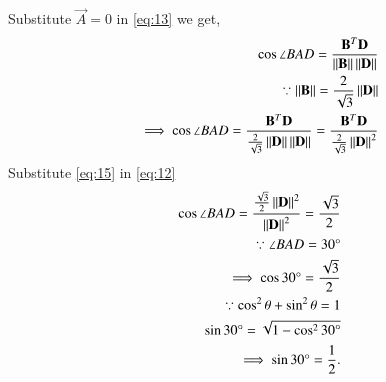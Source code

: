 \documentclass[journal,12pt,twocolumn]{IEEEtran}
\begin{document}
Substitute $\vec{A}=0$ in \eqref{eq:13} we get,
\begin{align}
    \cos{\angle{BAD}}=\frac{\mathbf{B}^T\mathbf{D}}{\left\lVert\mathbf{B}\right\rVert\left\lVert\mathbf{D}\right\rVert}\\
 \because\left\lVert\mathbf{B}\right\rVert=\frac{2}{\sqrt{3}}\left\lVert\mathbf{D}\right\rVert\\
     \label{eq:12}\implies\cos{\angle{BAD}}=\frac{\mathbf{B}^T\mathbf{D}}{\frac{2}{\sqrt{3}}\left\lVert\mathbf{D}\right\rVert\left\lVert\mathbf{D}\right\rVert} = \frac{\mathbf{B}^T\mathbf{D}}{\frac{2}{\sqrt{3}}\left\lVert\mathbf{D}\right\rVert^2}
\end{align}
Substitute \eqref{eq:15} in \eqref{eq:12}
\begin{align}
\cos\angle{BAD} = \frac{{\frac{\sqrt{3}}{2}\left\lVert\mathbf{D}\right\rVert^2}}{\left\lVert\mathbf{D}\right\rVert^2}= \frac{\sqrt{3}}{2}\\
\because \angle{BAD}= 30\degree\\
\implies \cos{30\degree}= \frac{\sqrt{3}}{2}\\
    \because \cos^2\theta +\sin^2\theta = 1\\
     \sin30\degree = \sqrt{1-\cos^230\degree}\\
    \implies\sin30\degree = \frac{1}{2}.
\end{align} 
\end{document}
